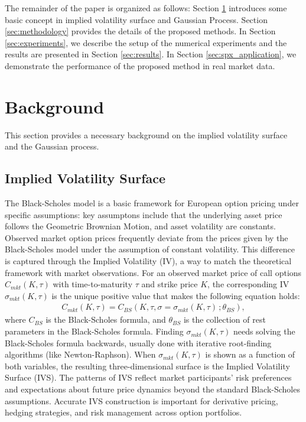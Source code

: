 \documentclass[preprint,12pt]{elsarticle}
\begin{document}
The remainder of the paper is organized as follows: Section \ref{sec:background} introduces some basic concept in implied volatility surface and Gaussian Process. Section \ref{sec:methodology} provides the details of the proposed methods. In Section \ref{sec:experiments}, we describe the setup of the numerical experiments and the results are presented in Section \ref{sec:results}. In Section \ref{sec:spx_application}, we demonstrate the performance of the proposed method in real market data.

\section{Background} \label{sec:background}

This section provides a necessary background on the implied volatility surface and the Gaussian process.

\subsection{Implied Volatility Surface}
      The Black-Scholes model \citep{black1973pricing} is a basic framework for European option pricing under specific assumptions: key assumptons include that the underlying asset price follows the Geometric Brownian Motion, and asset volatility are constants. Observed market option prices frequently deviate from the prices given by the Black-Scholes model under the assumption of constant volatility. This difference is captured through the Implied Volatility (IV), a way to match the theoretical framework with market observations. For an observed market price of call options $C_{mkt}(K, \tau)$ with time-to-maturity $\tau$ and strike price $K$, the corresponding IV $\sigma_{mkt}(K,\tau)$ is the unique positive value that makes the following equation holds:
        \begin{align}
        C_{mkt}(K, \tau) = C_{BS}(K, \tau, \sigma = \sigma_{mkt}(K,\tau)\,;\theta_{BS}),
        \end{align}
        where $C_{BS}$ is the Black-Scholes formula, and $\theta_{BS}$ is the collection of rest parameters in the Black-Scholes formula.
        Finding $\sigma_{mkt}(K,\tau)$ needs solving the Black-Scholes formula backwards, usually done with iterative root-finding algorithms (like Newton-Raphson). When $\sigma_{mkt}(K,\tau)$ is shown as a function of both variables, the resulting three-dimensional surface is the Implied Volatility Surface (IVS). The patterns of IVS reflect market participants' risk preferences and expectations about future price dynamics beyond the standard Black-Scholes assumptions. Accurate IVS construction is important for derivative pricing, hedging strategies, and risk management across option portfolios.
\end{document}
